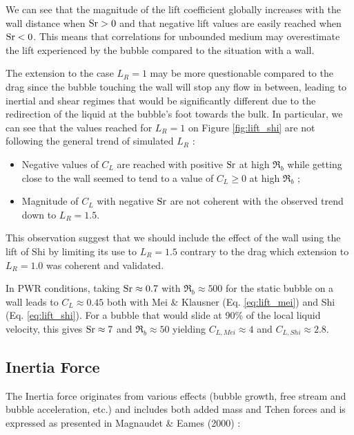 We can see that the magnitude of the lift coefficient globally increases with the wall distance when $\mathrm{Sr} >0$ and that negative lift values are easily reached when $\mathrm{Sr} <0$. This means that correlations for unbounded medium may overestimate the lift experienced by the bubble compared to the situation with a wall. 

The extension to the case $L_{R}=1$ may be more questionable compared to the drag since the bubble touching the wall will stop any flow in between, leading to inertial and shear regimes that would be significantly different due to the redirection of the liquid at the bubble's foot towards the bulk. In particular, we can see that the values reached for $L_{R}=1$ on Figure \ref{fig:lift_shi} are not following the general trend of simulated $L_{R}$ :

\begin{itemize}
\item Negative values of $C_{L}$ are reached with positive $\mathrm{Sr}$ at high $\Re_{b}$ while getting close to the wall seemed to tend to a value of $C_{L} \geq 0$ at high $\Re_{b}$ ;
\item Magnitude of $C_{L}$ with negative $\mathrm{Sr}$ are not coherent with the observed trend down to $L_{R}=1.5$.
\end{itemize}

This observation suggest that we should include the effect of the wall using the lift of Shi \etal by limiting its use to $L_{R}=1.5$ contrary to the drag which extension to $L_{R}=1.0$ was coherent and validated.

\npar

\begin{remark*}{}
In PWR conditions, taking $\mathrm{Sr} \approx 0.7$ with $\Re_{b} \approx 500$ for the static bubble on a wall leads to $C_{L}\approx 0.45$ both with Mei \& Klausner (Eq. \ref{eq:lift_mei}) and Shi \etal (Eq. \ref{eq:lift_shi}). For a bubble that would slide at 90\% of the local liquid velocity, this gives $\mathrm{Sr} \approx 7$ and $\Re_{b} \approx 50$ yielding $C_{L,Mei} \approx 4$ and $C_{L,Shi} \approx 2.8$.
\end{remark*}


\subsection{Inertia Force}
\label{subsec:AM}

The Inertia force originates from various effects (bubble growth, free stream and bubble acceleration, etc.) and includes both added mass and Tchen forces and is expressed as presented in Magnaudet \& Eames (2000) \cite{magnaudet_motion_2000}:

